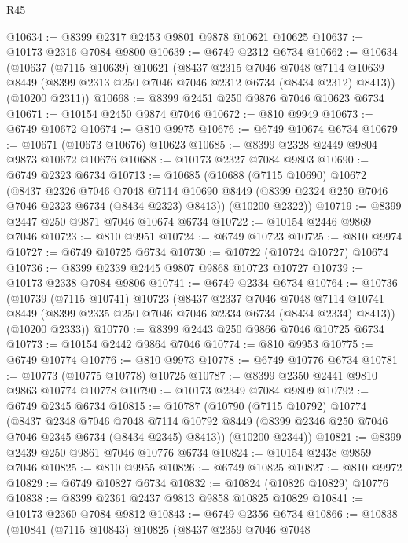 \begin{lexlean}{R45}
\begin{coremodule}
{@10634 := @8399 @2317 @2453 @9801 @9878 @10621 @10625
@10637 := @10173 @2316 @7084 @9800
@10639 := @6749 @2312 @6734
@10662 := @10634
    (@10637
      (@7115 @10639)
      @10621
      (@8437
        @2315
        @7046
        @7048
        @7114
        @10639
        @8449
        (@8399 @2313 @250 @7046 @7046 @2312 @6734 (@8434 @2312) @8413))
      (@10200 @2311))
@10668 := @8399 @2451 @250 @9876 @7046 @10623 @6734
@10671 := @10154 @2450 @9874 @7046
@10672 := @810 @9949
@10673 := @6749 @10672
@10674 := @810 @9975
@10676 := @6749 @10674 @6734
@10679 := @10671 (@10673 @10676) @10623
@10685 := @8399 @2328 @2449 @9804 @9873 @10672 @10676
@10688 := @10173 @2327 @7084 @9803
@10690 := @6749 @2323 @6734
@10713 := @10685
    (@10688
      (@7115 @10690)
      @10672
      (@8437
        @2326
        @7046
        @7048
        @7114
        @10690
        @8449
        (@8399 @2324 @250 @7046 @7046 @2323 @6734 (@8434 @2323) @8413))
      (@10200 @2322))
@10719 := @8399 @2447 @250 @9871 @7046 @10674 @6734
@10722 := @10154 @2446 @9869 @7046
@10723 := @810 @9951
@10724 := @6749 @10723
@10725 := @810 @9974
@10727 := @6749 @10725 @6734
@10730 := @10722 (@10724 @10727) @10674
@10736 := @8399 @2339 @2445 @9807 @9868 @10723 @10727
@10739 := @10173 @2338 @7084 @9806
@10741 := @6749 @2334 @6734
@10764 := @10736
    (@10739
      (@7115 @10741)
      @10723
      (@8437
        @2337
        @7046
        @7048
        @7114
        @10741
        @8449
        (@8399 @2335 @250 @7046 @7046 @2334 @6734 (@8434 @2334) @8413))
      (@10200 @2333))
@10770 := @8399 @2443 @250 @9866 @7046 @10725 @6734
@10773 := @10154 @2442 @9864 @7046
@10774 := @810 @9953
@10775 := @6749 @10774
@10776 := @810 @9973
@10778 := @6749 @10776 @6734
@10781 := @10773 (@10775 @10778) @10725
@10787 := @8399 @2350 @2441 @9810 @9863 @10774 @10778
@10790 := @10173 @2349 @7084 @9809
@10792 := @6749 @2345 @6734
@10815 := @10787
    (@10790
      (@7115 @10792)
      @10774
      (@8437
        @2348
        @7046
        @7048
        @7114
        @10792
        @8449
        (@8399 @2346 @250 @7046 @7046 @2345 @6734 (@8434 @2345) @8413))
      (@10200 @2344))
@10821 := @8399 @2439 @250 @9861 @7046 @10776 @6734
@10824 := @10154 @2438 @9859 @7046
@10825 := @810 @9955
@10826 := @6749 @10825
@10827 := @810 @9972
@10829 := @6749 @10827 @6734
@10832 := @10824 (@10826 @10829) @10776
@10838 := @8399 @2361 @2437 @9813 @9858 @10825 @10829
@10841 := @10173 @2360 @7084 @9812
@10843 := @6749 @2356 @6734
@10866 := @10838
    (@10841
      (@7115 @10843)
      @10825
      (@8437
        @2359
        @7046
        @7048
}
\end{coremodule}
\end{lexlean}
